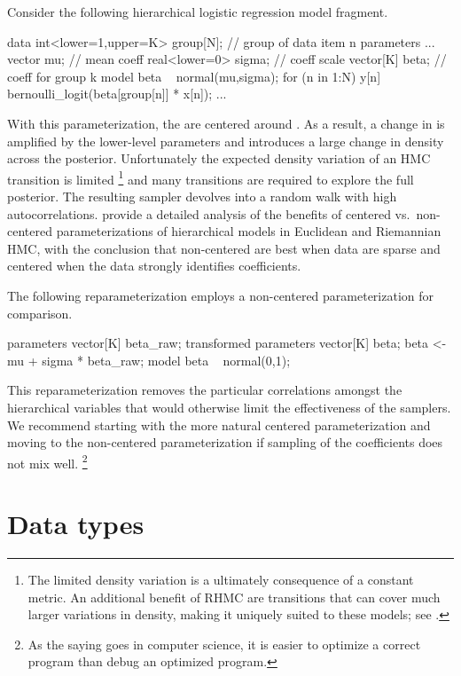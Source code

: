 \documentclass[article]{jss}
\begin{document}
Consider the following hierarchical logistic regression model fragment.
%
\begin{Code}
data {
  int<lower=1,upper=K> group[N];  // group of data item n
}  
parameters {
  ...
  vector mu;             // mean coeff
  real<lower=0> sigma;   // coeff scale
  vector[K] beta;        // coeff for group k
}
model {
  beta ~ normal(mu,sigma);
  for (n in 1:N)
    y[n] ~ bernoulli_logit(beta[group[n]] * x[n]);
  ...
}
\end{Code}
%
With this parameterization, the  are centered around
.  As a result, a change in  is amplified by the
lower-level parameters and introduces a large change in density across
the posterior.  Unfortunately the expected density variation of an HMC
transition is limited%
%
\footnote{The limited density variation is a ultimately consequence of
  a constant metric.  An additional benefit of RHMC are transitions
  that can cover much larger variations in density, making it uniquely
  suited to these models; see \citep{Neal:2011}.}
%
and many transitions are required to explore the full posterior.  The
resulting sampler devolves into a random walk with high
autocorrelations.  \cite{BetancourtGirolami:2013} provide a detailed
analysis of the benefits of centered vs.\ non-centered
parameterizations of hierarchical models in Euclidean and Riemannian
HMC, with the conclusion that non-centered are best when data are
sparse and centered when the data strongly identifies coefficients.

The following reparameterization employs a non-centered
parameterization for comparison.
%
\begin{Code}
parameters {
  vector[K] beta_raw;    
}
transformed parameters {
  vector[K] beta;
  beta <- mu + sigma * beta_raw;
}
model {
  beta ~ normal(0,1);
}
\end{Code}
%
This reparameterization removes the particular correlations amongst the
hierarchical variables that would otherwise limit the effectiveness
of the samplers.  We recommend starting with the more natural centered
parameterization and moving to the non-centered parameterization if
sampling of the coefficients does not mix well.%
%
\footnote{As the saying goes in computer science, it is easier to
  optimize a correct program than debug an optimized program.}

\section{Data types}
\end{document}
